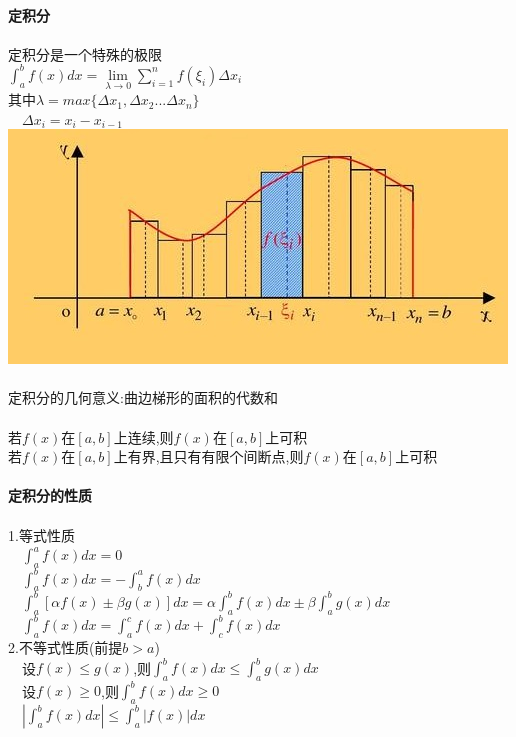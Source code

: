 \documentclass{article}
\begin{document}
\begin{flushleft}
	\fontsize{24pt}{30pt}\selectfont
	~\\ \textbf{定积分} \\~\\
	定积分是一个特殊的极限\\
	$\int_{a}^{b}f(x)dx=\lim\limits_{\lambda\to 0}\sum_{i=1}^{n}f(\xi_i)\Delta x_i$\\
	其中$\lambda = max\{\Delta x_1, \Delta x_2...\Delta x_n\}$\\
	\ \ $\Delta x_i=x_i-x_{i-1}$\\
	\includegraphics[scale=1.0]{2.jpg}\\
	~\\
	定积分的几何意义:曲边梯形的面积的代数和\\
	~\\
	若$f(x)$在$[a,b]$上连续,则$f(x)$在$[a,b]$上可积\\
	若$f(x)$在$[a,b]$上有界,且只有有限个间断点,则$f(x)$在$[a,b]$上可积\\
	~\\ \textbf{定积分的性质} \\~\\
	1.等式性质\\
	\ \ $\int_{a}^{a}f(x)dx=0$\\
	\ \ $\int_{a}^{b}f(x)dx=-\int_{b}^{a}f(x)dx$\\
	\ \ $\int_{a}^{b}[\alpha f(x)\pm \beta g(x)]dx=\alpha\int_{a}^{b}f(x)dx\pm \beta\int_{a}^{b}g(x)dx$\\
	\ \ $\int_{a}^{b}f(x)dx=\int_{a}^{c}f(x)dx+\int_{c}^{b}f(x)dx$\\
	2.不等式性质(前提$b>a$)\\
	\ \ 设$f(x)\le g(x)$,则$\int_{a}^{b}f(x)dx\le \int_{a}^{b}g(x)dx$\\
	\ \ 设$f(x)\ge 0$,则$\int_{a}^{b}f(x)dx \ge 0$\\
	\ \ $|\int_{a}^{b}f(x)dx| \le \int_{a}^{b}|f(x)|dx$\\

\end{flushleft}
\end{document}

